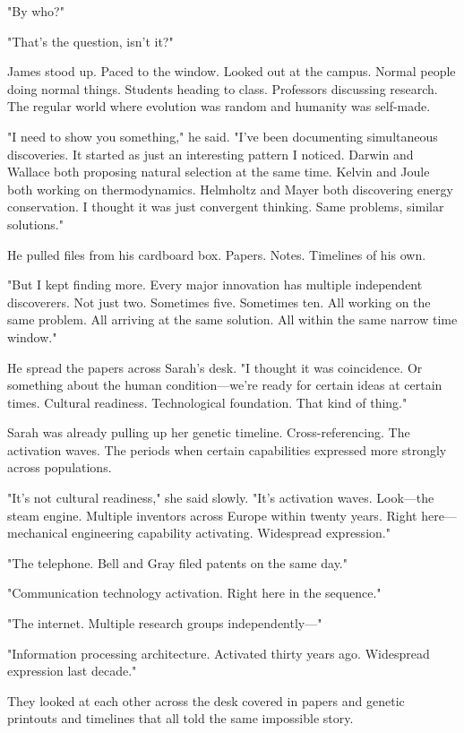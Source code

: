 "By who?"

"That's the question, isn't it?"

James stood up. Paced to the window. Looked out at the campus. Normal people doing normal things. Students heading to class. Professors discussing research. The regular world where evolution was random and humanity was self-made.

"I need to show you something," he said. "I've been documenting simultaneous discoveries. It started as just an interesting pattern I noticed. Darwin and Wallace both proposing natural selection at the same time. Kelvin and Joule both working on thermodynamics. Helmholtz and Mayer both discovering energy conservation. I thought it was just convergent thinking. Same problems, similar solutions."

He pulled files from his cardboard box. Papers. Notes. Timelines of his own.

"But I kept finding more. Every major innovation has multiple independent discoverers. Not just two. Sometimes five. Sometimes ten. All working on the same problem. All arriving at the same solution. All within the same narrow time window."

He spread the papers across Sarah's desk. "I thought it was coincidence. Or something about the human condition—we're ready for certain ideas at certain times. Cultural readiness. Technological foundation. That kind of thing."

Sarah was already pulling up her genetic timeline. Cross-referencing. The activation waves. The periods when certain capabilities expressed more strongly across populations.

"It's not cultural readiness," she said slowly. "It's activation waves. Look—the steam engine. Multiple inventors across Europe within twenty years. Right here—mechanical engineering capability activating. Widespread expression."

"The telephone. Bell and Gray filed patents on the same day."

"Communication technology activation. Right here in the sequence."

"The internet. Multiple research groups independently—"

"Information processing architecture. Activated thirty years ago. Widespread expression last decade."

They looked at each other across the desk covered in papers and genetic printouts and timelines that all told the same impossible story.

